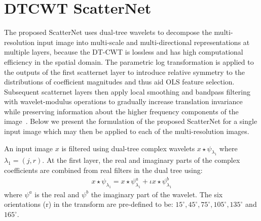 \documentclass{article}
\begin{document}
\section{DTCWT ScatterNet}
\label{sec:typestyle}
The proposed ScatterNet uses dual-tree wavelets to decompose the multi-resolution input image into multi-scale and multi-directional representations at multiple layers, because the DT-CWT is lossless and has high computational efficiency in the spatial domain. The parametric log transformation is applied to the outputs of the first scatternet layer to introduce relative symmetry to the distributions of coefficient magnitudes and thus aid OLS feature selection. Subsequent scatternet layers then apply local smoothing and bandpass filtering with wavelet-modulus operations to gradually increase translation invariance while preserving information about the higher frequency components of the image~\cite{Jbruna2013}. Below we present the formulation of the proposed ScatterNet for a single input image which may then be applied to each of the multi-resolution images.

An input image $x$ is filtered using dual-tree complex wavelets $ x\star \psi_{\lambda_{1} }$ where $\lambda_1 = (j,r)$.  At the first layer, the real and imaginary parts of the complex coefficients are combined from real filters in the dual tree using:
\vspace{-0.3em}
\begin{align}
 x\star \psi_{\lambda_{1} } = x\star\psi_{\lambda_{1} }^{a} + \iota x\star\psi_{\lambda_{1} }^{b}  
\end{align}
where $\psi^{a}$ is the real and $\psi^{b}$ the imaginary part of the wavelet. The six orientations (r) in the transform are pre-defined to be: $15^\circ, 45^\circ, 75^\circ, 105^\circ, 135^\circ$ and $165^\circ$. 
\end{document}
